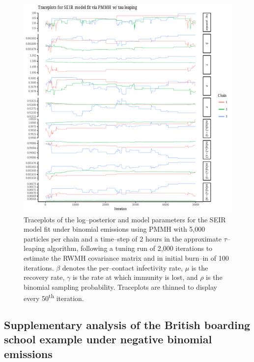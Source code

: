 \begin{figure}[htbp]
	\centering
	\includegraphics[width=\linewidth]{figures/bbs_seir_pmmh_traceplots.pdf}
	\caption{Traceplots of the log--posterior and model parameters for the SEIR model fit under binomial emissions using PMMH with 5,000 particles per chain and a time--step of 2 hours in the approximate $ \tau $--leaping algorithm, following a tuning run of 2,000 iterations to estimate the RWMH covariance matrix and in initial burn--in of 100 iterations. $ \beta $ denotes the per--contact infectivity rate, $ \mu $ is the recovery rate, $ \gamma $ is the rate at which immunity is lost, and $ \rho $ is the binomial sampling probability. Traceplots are thinned to display every 50\textsuperscript{th} iteration.}
	\label{fig:bbs_seir_pmmh_traceplots}
\end{figure}

\newpage 

\subsection{Supplementary analysis of the British boarding school example under negative binomial emissions}
\label{sec:bbs_neg_binom}

